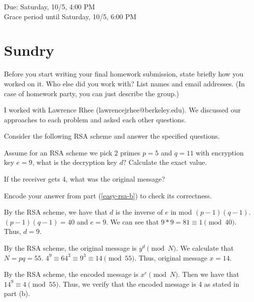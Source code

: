\documentclass[11pt]{article}
\begin{document}
\maketitle
\fontsize{12}{15}\selectfont

\begin{center}
    Due: Saturday, 10/5, 4:00 PM \\
    Grace period until Saturday, 10/5, 6:00 PM \\
\end{center}

\section*{Sundry}
Before you start writing your final homework submission, state briefly how you worked on it.  Who else did you work with?  List names and email addresses.  (In case of homework party, you can just describe the group.)

\begin{solution}
  I worked with Lawrence Rhee (lawrencejrhee@berkeley.edu). 
  We discussed our approaches to each problem and asked each other questions.  
\end{solution}
\vspace{15pt}


Consider the following RSA scheme and answer the specified questions.
\begin{Parts}
 
    \Part Assume for an RSA scheme we pick $2$ primes $p = 5$ and $q = 11$ with encryption key $e = 9$, what is the decryption key $d$? Calculate the exact value.
    
    
    \Part If the receiver gets 4, what was the original message? \label{easy-rsa-b}
    
    
    \Part Encode your answer from part (\ref{easy-rsa-b}) to check its correctness.
    
\end{Parts}

\begin{solution} \begin{Parts} \Part 
By the RSA scheme, we have that $d$ is the inverse of $e$ in mod $(p-1)(q-1)$.
$(p-1)(q-1)=40$ and $e=9$. We can see that $9*9=81\equiv1\pmod{40}$. Thus, $d=9$.

\Part 
By the RSA scheme, the original message is $y^d\pmod{N}$.
We calculate that $N=pq=55$. 
$4^9\equiv64^3\equiv9^3\equiv14\pmod{55}$. Thus, original message $x=14$.

\Part 
By the RSA scheme, the encoded message is $x^e\pmod{N}$. 
Then we have that $14^9\equiv4\pmod{55}$. 
Thus, we verify that the encoded message is 4 as stated in part (b).

\end{Parts}\end{solution}\newpage
\end{document}
